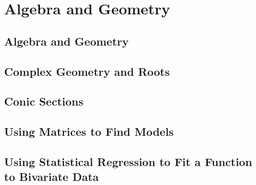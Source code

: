 \documentclass[../precalc.tex]{subfiles}
\begin{document}
\chapter{Algebra and Geometry}
\section{Algebra and Geometry}
\section{Complex Geometry and Roots}
\section{Conic Sections}
\section{Using Matrices to Find Models}
\section{Using Statistical Regression to Fit a Function to Bivariate Data}
\end{document}
